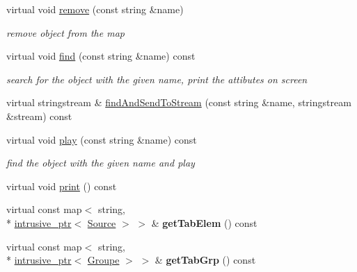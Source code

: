 \begin{DoxyCompactItemize}
virtual void \hyperlink{classFactory_a19c210120de78055b7d26952cbd7ccf9}{remove} (const string \&name)
\begin{DoxyCompactList}\small\item\em remove object from the map \end{DoxyCompactList}\item 
virtual void \hyperlink{classFactory_af428602526d9e9ad59c4cd47f8122ab5}{find} (const string \&name) const 
\begin{DoxyCompactList}\small\item\em search for the object with the given name, print the attibutes on screen \end{DoxyCompactList}\item 
virtual stringstream \& \hyperlink{classFactory_ac67265c1bee588c7073dee61cd4fedcf}{find\-And\-Send\-To\-Stream} (const string \&name, stringstream \&stream) const 
\item 
virtual void \hyperlink{classFactory_a86d5952126f2cb3e4e5fb8969be7bf16}{play} (const string \&name) const 
\begin{DoxyCompactList}\small\item\em find the object with the given name and play \end{DoxyCompactList}\item 
virtual void \hyperlink{classFactory_abf37af5ba84549ec2bbdc33a24bf5423}{print} () const 
\item 
\hypertarget{classFactory_aa90d5dfc315d1925e8706b666f748687}{virtual const map$<$ string, \\*
\hyperlink{classintrusive__ptr}{intrusive\-\_\-ptr}$<$ \hyperlink{classSource}{Source} $>$ $>$ \& {\bfseries get\-Tab\-Elem} () const }\label{classFactory_aa90d5dfc315d1925e8706b666f748687}

\item 
\hypertarget{classFactory_a6fa35d8e4547900bd396806c5d8fba37}{virtual const map$<$ string, \\*
\hyperlink{classintrusive__ptr}{intrusive\-\_\-ptr}$<$ \hyperlink{classGroupe}{Groupe} $>$ $>$ \& {\bfseries get\-Tab\-Grp} () const }\label{classFactory_a6fa35d8e4547900bd396806c5d8fba37}

\end{DoxyCompactItemize}


